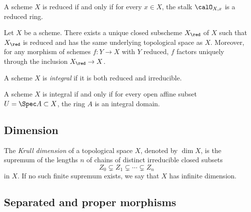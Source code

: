     \begin{proposition}\label{prop:reducedness_is_a_local_property}
        A scheme \(X\) is reduced if and only if for every \(x \in X\), the stalk \(\calO_{X,x}\) is a reduced ring.
    \end{proposition}

    \begin{proposition}\label{prop:universal_property_of_reduced_structure_on_a_scheme}
        Let \(X\) be a scheme.
        There exists a unique closed subscheme \(X_{\red}\) of \(X\) such that \(X_{\red}\) is reduced and has the same underlying topological space as \(X\).
        Moreover, for any morphism of schemes \(f : Y \to X\) with \(Y\) reduced, \(f\) factors uniquely through the inclusion \(X_{\red} \to X\).
    \end{proposition}

    \begin{definition}\label{def:integral_scheme}
        A scheme \(X\) is \emph{integral} if it is both reduced and irreducible.
    \end{definition}

    \begin{proposition}\label{prop:integral_scheme_characterization}
        A scheme \(X\) is integral if and only if for every open affine subset \(U = \Spec A \subset X\), the ring \(A\) is an integral domain.
    \end{proposition}

\subsection{Dimension}

    \begin{definition}\label{def:krull_dimension_of_topological_space}
        The \emph{Krull dimension} of a topological space \(X\), denoted by \(\dim X\), is the supremum of the lengths \(n\) of chains of distinct irreducible closed subsets
        \[ Z_0 \subsetneq Z_1 \subsetneq \cdots \subsetneq Z_n \]
        in \(X\).
        If no such finite supremum exists, we say that \(X\) has infinite dimension.
    \end{definition}

\subsection{Separated and proper morphisms}

